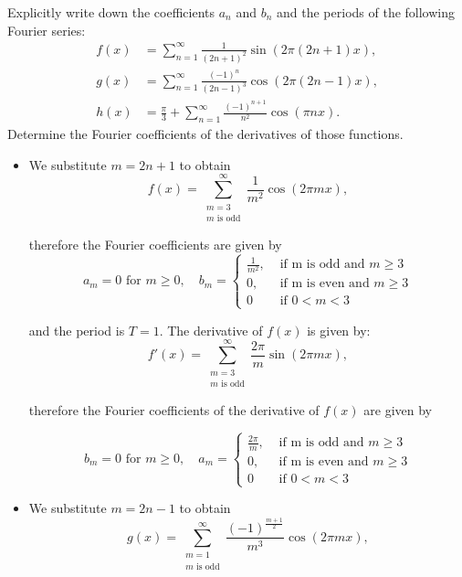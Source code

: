 \documentclass[11pt]{article}
\begin{document}
\begin{exercise}
    Explicitly write down the coefficients $a_n$ and $b_n$ and the periods of the following Fourier series:
    \begin{align*}
        f(x) &= \sum_{n=1}^{\infty} \frac{1}{(2n+1)^2}\sin(2\pi (2n+1) x),
        \\
        g(x) &= \sum_{n=1}^{\infty} \frac{(-1)^n}{(2n-1)^3}\cos(2\pi (2n-1) x),
        \\
        h(x) &= \frac \pi 3 + \sum_{n=1}^{\infty} \frac{(-1)^{n+1}}{n^2}\cos(\pi n x).
    \end{align*}
    Determine the Fourier coefficients of the derivatives of those functions. 
\end{exercise}
\begin{solution}     
    \begin{itemize}
    \item We substitute $m = 2n+1$ to obtain 
    $$
            f(x) = \sum_{\substack{m=3\\m \text{ is odd}}}^{\infty} \frac{1}{m^2}\cos(2\pi m x),
    $$

    therefore the Fourier coefficients are given by 
    $$
    a_m = 0 \text{ for } m \geq 0, \quad b_m = \begin{cases}\frac{1}{m^2}, & \text { if m is odd and }m \geq 3 \\ 0, & \text{ if m is even and } m \geq 3\\ 0 & \text{ if } 0< m < 3  \end{cases} 
    $$

    and the period is $T = 1$. The derivative of $f(x)$ is given by:
    $$
    f'(x) = \sum_{\substack{m=3\\m \text{ is odd}}}^{\infty} \frac{2\pi}{m}\sin(2\pi m x),
    $$

    therefore the Fourier coefficients of the derivative of $f(x)$ are given by 

    $$
    b_m = 0 \text{ for } m \geq 0, \quad a_m = \begin{cases}\frac{2\pi}{m}, & \text { if m is odd and }m \geq 3 \\ 0, & \text{ if m is even and } m \geq 3\\ 0 & \text{ if } 0< m < 3  \end{cases} 
    $$

    \item We substitute $m = 2n-1$ to obtain 
    $$
        g(x) = \sum_{\substack{ m=1 \\ m \text{ is odd}}}^{\infty} \frac{(-1)^{\frac{m+1}{2}}}{m^3}\cos(2\pi m x),
    $$


\end{itemize}
\end{solution}
\end{document}
